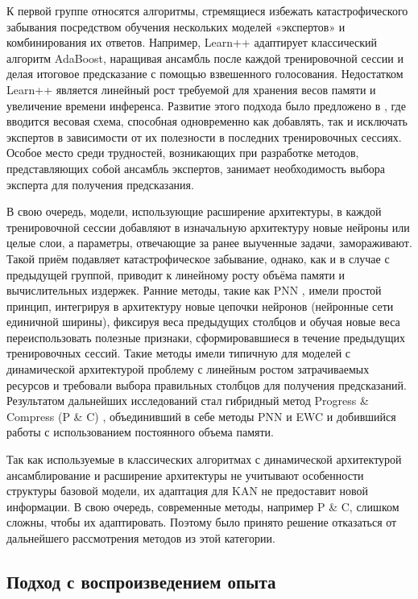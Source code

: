 \documentclass[a4paper,14pt]{extarticle}
\begin{document}
К первой группе относятся алгоритмы, стремящиеся избежать катастрофического
забывания посредством обучения нескольких моделей «экспертов» и комбинирования
их ответов. Например, Learn++ \cite{polikar2001learn} адаптирует классический
алгоритм AdaBoost, наращивая ансамбль после каждой тренировочной сессии
и делая итоговое предсказание с помощью взвешенного голосования. Недостатком
Learn++ является линейный рост требуемой для хранения весов памяти и
увеличение времени инференса. Развитие этого подхода было предложено в
\cite{ren2017lifelong}, где вводится весовая схема, способная одновременно как
добавлять, так и исключать экспертов в зависимости от их полезности в последних
тренировочных сессиях. Особое место среди трудностей, возникающих при разработке
методов, представляющих собой ансамбль экспертов, занимает необходимость выбора
эксперта для получения предсказания.

В свою очередь, модели, использующие расширение архитектуры, в каждой
тренировочной сессии добавляют в изначальную архитектуру новые нейроны или целые
слои, а параметры, отвечающие за ранее выученные задачи, замораживают. Такой
приём подавляет катастрофическое забывание, однако, как и в случае с предыдущей
группой, приводит к линейному росту объёма памяти и вычислительных издержек.
Ранние методы, такие как PNN \cite{rusu2016progressive}, имели простой принцип,
интегрируя в архитектуру новые цепочки нейронов (нейронные сети единичной
ширины), фиксируя веса предыдущих столбцов и обучая новые веса переиспользовать
полезные признаки, сформировавшиеся в течение предыдущих тренировочных сессий.
Такие методы имели типичную для моделей с динамической архитектурой проблему с
линейным ростом затрачиваемых ресурсов и требовали выбора правильных столбцов 
для получения предсказаний. Результатом дальнейших исследований стал гибридный
метод Progress \& Compress (P \& C) \cite{schwarz2018progress}, объединивший в
себе методы PNN и EWC и добившийся работы с использованием постоянного объема
памяти.

Так как используемые в классических алгоритмах с динамической архитектурой
ансамблирование и расширение архитектуры не учитывают особенности структуры
базовой модели, их адаптация для KAN не предоставит новой информации. В свою
очередь, современные методы, например P \& C, слишком сложны, чтобы их
адаптировать. Поэтому было принято решение отказаться от дальнейшего 
рассмотрения методов из этой категории.
\subsection{Подход с воспроизведением опыта}
\end{document}
